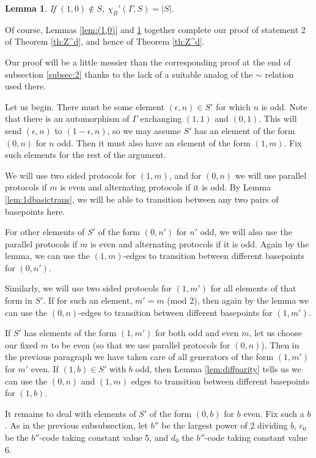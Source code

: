 \documentclass[10pt,a4paper]{article}
\newcommand{\0}{\varnothing}
\newtheorem{lemma}{Lemma}
\begin{document}
\begin{lemma}\label{lem:no(1,0)}
If $(1,0) \notin S$, $\chi_B'(\Gamma,S) = |S|$.
\end{lemma}

Of course, Lemmas \ref{lem:(1,0)} and \ref{lem:no(1,0)} together complete our proof of statement 2 of Theorem \ref{th:Z^d}, and hence of Theorem \ref{th:Z^d}.

Our proof will be a little messier than the corresponding proof at the end of subsection \ref{subsec:2} thanks to the lack of a suitable analog of the $\sim$ relation used there.

Let us begin. There must be some element $(\epsilon,n) \in S'$ for which $n$ is odd. Note that there is an automorphism of $\Gamma$ exchanging $(1,1)$ and $(0,1)$. This will send $(\epsilon,n)$ to $(1-\epsilon,n)$, so we may assume $S'$ has an element of the form $(0,n)$ for $n$ odd. Then it must also have an element of the form $(1,m)$. Fix such elements for the rest of the argument.

We will use two sided protocols for $(1,m)$, and for $(0,n)$ we will use parallel protocols if $m$ is even and alternating protocols if it is odd.
By Lemma \ref{lem:1dbasictrans}, we will be able to transition between any two pairs of basepoints here.

For other elements of $S'$ of the form $(0,n')$ for $n'$ odd, we will also use the parallel protocols if $m$ is even and alternating protocols if it is odd. Again by the lemma, we can use the $(1,m)$-edges to transition between different basepoints for $(0,n')$.

Similarly, we will use two sided protocols for $(1,m')$ for all elements of that form in $S'$. If for such an element, $m' = m$ (mod 2), then again by the lemma we can use the $(0,n)$-edges to transition between different basepoints for $(1,m')$.

If $S'$ has elements of the form $(1,m')$ for both odd and even $m$, let us choose our fixed $m$ to be even (so that we use parallel protocols for $(0,n)$). Then in the previous paragraph we have taken care of all generators of the form $(1,m')$ for $m'$ even. If $(1,b) \in S'$ with $b$ odd, then Lemma \ref{lem:diffparity} tells us we can use the $(0,n)$ and $(1,m)$ edges to transition between different basepoints for $(1,b)$.

It remains to deal with elements of $S'$ of the form $(0,b)$ for $b$ even. Fix such a $b$. As in the previous subsubsection, let $b''$ be the largest power of 2 dividing $b$, $c_0$ be the $b''$-code taking constant value 5, and $d_0$ the $b''$-code taking constant value 6.
\end{document}

